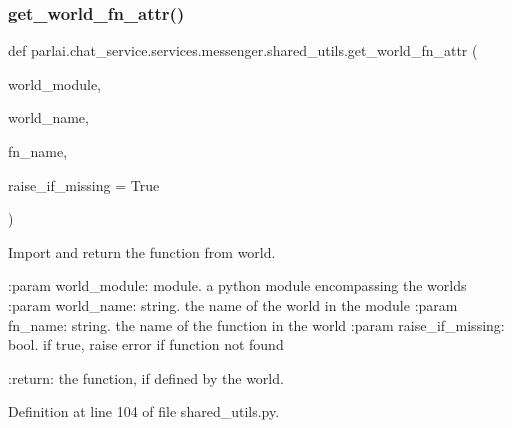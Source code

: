 \subsubsection{\texorpdfstring{get\+\_\+world\+\_\+fn\+\_\+attr()}{get\_world\_fn\_attr()}}
{\footnotesize\ttfamily def parlai.\+chat\+\_\+service.\+services.\+messenger.\+shared\+\_\+utils.\+get\+\_\+world\+\_\+fn\+\_\+attr (\begin{DoxyParamCaption}\item[{}]{world\+\_\+module,  }\item[{}]{world\+\_\+name,  }\item[{}]{fn\+\_\+name,  }\item[{}]{raise\+\_\+if\+\_\+missing = {\ttfamily True} }\end{DoxyParamCaption})}

\begin{DoxyVerb}Import and return the function from world.

:param world_module:
    module. a python module encompassing the worlds
:param world_name:
    string. the name of the world in the module
:param fn_name:
    string. the name of the function in the world
:param raise_if_missing:
    bool. if true, raise error if function not found

:return:
    the function, if defined by the world.
\end{DoxyVerb}
 

Definition at line 104 of file shared\+\_\+utils.\+py.


